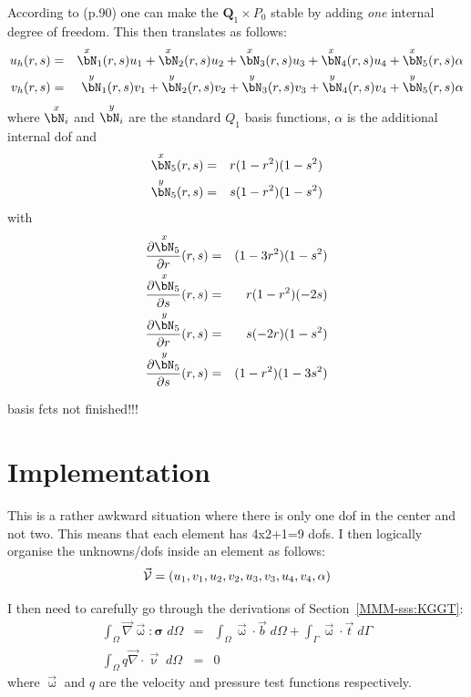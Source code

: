 According to \textcite{bobf08} (p.90) one can make the ${\bm Q}_1 \times P_0$ stable by adding {\it one}
internal degree of freedom. This then translates as follows:
\begin{eqnarray}
u_h(r,s) &=& 
\overset{\tiny x}{\bN}_1(r,s) u_1 +
\overset{\tiny x}{\bN}_2(r,s) u_2 +
\overset{\tiny x}{\bN}_3(r,s) u_3 +
\overset{\tiny x}{\bN}_4(r,s) u_4 + 
\overset{\tiny x}{\bN}_5(r,s) \alpha \\
v_h(r,s) &=& 
\overset{\small y}{\bN}_1(r,s) v_1 +
\overset{\small y}{\bN}_2(r,s) v_2 +
\overset{\small y}{\bN}_3(r,s) v_3 +
\overset{\small y}{\bN}_4(r,s) v_4 + 
\overset{\small y}{\bN}_5(r,s) \alpha 
\end{eqnarray}
where $\overset{\small x}{\bN_i}$ and $\overset{\small y}{\bN_i}$ 
are the standard $Q_1$ basis functions, $\alpha$ is the additional 
internal dof and 
\begin{eqnarray}
\overset{\small x}{\bN}_5(r,s) &=& r(1-r^2)(1-s^2) \\
\overset{\small y}{\bN}_5(r,s) &=& s(1-r^2)(1-s^2) 
\end{eqnarray}
with
\begin{eqnarray}
\frac{\partial \overset{\small x}{\bN}_5}{\partial r}(r,s) &=& (1-3r^2)(1-s^2) \\
\frac{\partial \overset{\small x}{\bN}_5}{\partial s}(r,s) &=& r(1-r^2)(-2s) \\
\frac{\partial \overset{\small y}{\bN}_5}{\partial r}(r,s) &=& s(-2r)(1-s^2) \\
\frac{\partial \overset{\small y}{\bN}_5}{\partial s}(r,s) &=& (1-r^2)(1-3s^2) 
\end{eqnarray}

basis fcts not finished!!!


\section*{Implementation}

This is a rather awkward situation where there is only one dof in the center and not two. 
This means that each element has 4x2+1=9 dofs. 
I then logically organise the unknowns/dofs inside an element as follows:
\[
\vec{\cal V}=(u_1,v_1,u_2,v_2,u_3,v_3,u_4,v_4,\alpha)
\]

I then need to carefully go through the derivations of Section~\ref{MMM-sss:KGGT}:
\begin{eqnarray}
\int_\Omega \vec\nabla \vec{\upomega} : {\bm \sigma} \; d\Omega
&=& \int_\Omega \vec\upomega \cdot \vec{b} \; d\Omega 
+ \int_\Gamma \vec\upomega \cdot \vec{t} \; d\Gamma \\
\int_\Omega q \vec\nabla \cdot \vec{\upnu} \; d\Omega &=& 0
\end{eqnarray}
where $\vec\upomega$ and $q$ are the velocity and pressure test functions respectively. 

